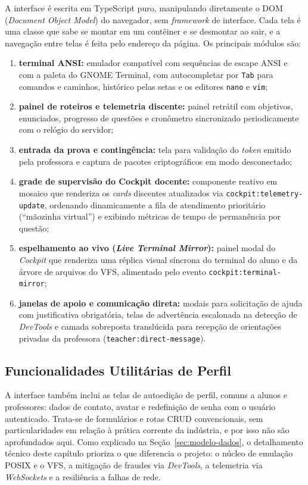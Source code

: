 A interface é escrita em TypeScript puro, manipulando diretamente o DOM (\textit{Document Object Model}) do navegador, sem \textit{framework} de interface. Cada tela é uma classe que sabe se montar em um contêiner e se desmontar ao sair, e a navegação entre telas é feita pelo endereço da página. Os principais módulos são:

\begin{enumerate}
    \item \textbf{terminal ANSI:} emulador compatível com sequências de escape ANSI e com a paleta do GNOME Terminal, com autocompletar por \texttt{Tab} para comandos e caminhos, histórico pelas setas e os editores \texttt{nano} e \texttt{vim};
    \item \textbf{painel de roteiros e telemetria discente:} painel retrátil com objetivos, enunciados, progresso de questões e cronômetro sincronizado periodicamente com o relógio do servidor;
    \item \textbf{entrada da prova e contingência:} tela para validação do \textit{token} emitido pela professora e captura de pacotes criptográficos em modo desconectado;
    \item \textbf{grade de supervisão do Cockpit docente:} componente reativo em mosaico que renderiza os \textit{cards} discentes atualizados via \texttt{cockpit:telemetry-update}, ordenando dinamicamente a fila de atendimento prioritário (``mãozinha virtual'') e exibindo métricas de tempo de permanência por questão;
    \item \textbf{espelhamento ao vivo (\textit{Live Terminal Mirror}):} painel modal do \textit{Cockpit} que renderiza uma réplica visual síncrona do terminal do aluno e da árvore de arquivos do VFS, alimentado pelo evento \texttt{cockpit:terminal-mirror};
    \item \textbf{janelas de apoio e comunicação direta:} modais para solicitação de ajuda com justificativa obrigatória, telas de advertência escalonada na detecção de \textit{DevTools} e camada sobreposta translúcida para recepção de orientações privadas da professora (\texttt{teacher:direct-message}).
\end{enumerate}

\subsection{Funcionalidades Utilitárias de Perfil}
\label{sec:perfil-utilitario}

A interface também inclui as telas de autoedição de perfil, comuns a alunos e professores: dados de contato, avatar e redefinição de senha com o usuário autenticado. Trata-se de formulários e rotas CRUD convencionais, sem particularidades em relação à prática corrente da indústria, e por isso não são aprofundados aqui. Como explicado na Seção~\ref{sec:modelo-dados}, o detalhamento técnico deste capítulo prioriza o que diferencia o projeto: o núcleo de emulação POSIX e o VFS, a mitigação de fraudes via \textit{DevTools}, a telemetria via \textit{WebSockets} e a resiliência a falhas de rede.

